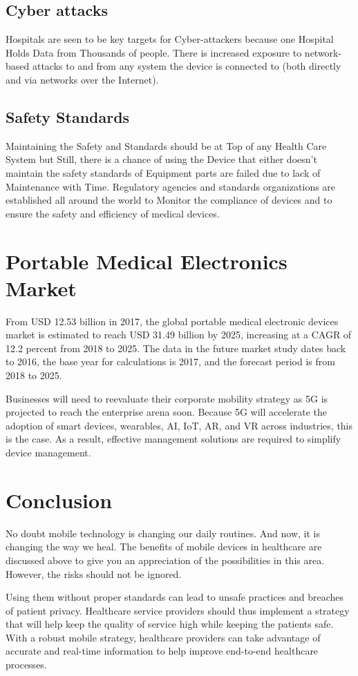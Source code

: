 \documentclass[12pt]{article}
\begin{document}
\subsection{Cyber attacks}
Hospitals are seen to be key targets for Cyber-attackers because one Hospital Holds Data from Thousands of people. There is increased exposure to network-based attacks to and from any system the device is connected to (both directly and via networks over the Internet).
\subsection{Safety Standards}
Maintaining the Safety and Standards should be at Top of any Health Care System but Still, there is a chance of using the Device that either doesn't maintain the safety standards of Equipment parts are failed due to lack of Maintenance with Time.
Regulatory agencies and standards organizations are established all around the world to Monitor the compliance of devices and to ensure the safety and efficiency of medical devices.
\section{Portable Medical Electronics Market}
From USD 12.53 billion in 2017, the global portable medical electronic devices market is estimated to reach USD 31.49 billion by 2025, increasing at a CAGR of 12.2 percent from 2018 to 2025. The data in the future market study dates back to 2016, the base year for calculations is 2017, and the forecast period is from 2018 to 2025.\cite{research:2021}

Businesses will need to reevaluate their corporate mobility strategy as 5G is projected to reach the enterprise arena soon. Because 5G will accelerate the adoption of smart devices, wearables, AI, IoT, AR, and VR across industries, this is the case. As a result, effective management solutions are required to simplify device management.
\section{Conclusion}
No doubt mobile technology is changing our daily routines. And now, it is changing the way we heal. The benefits of mobile devices in healthcare are discussed above to give you an appreciation of the possibilities in this area. However, the risks should not be ignored.

Using them without proper standards can lead to unsafe practices and breaches of patient privacy. Healthcare service providers should thus implement a strategy that will help keep the quality of service high while keeping the patients safe. With a robust mobile strategy, healthcare providers can take advantage of accurate and real-time information to help improve end-to-end healthcare processes.
\clearpage
{}
\printbibliography
{}
\end{document}
